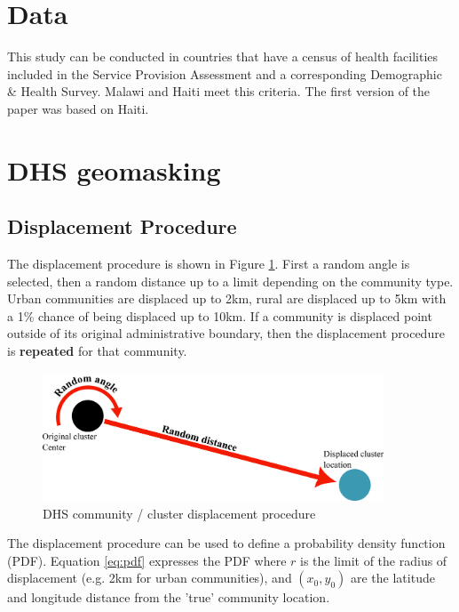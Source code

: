 \section{Data}

This study can be conducted in countries that have a census of health facilities included in the Service Provision Assessment and a corresponding Demographic \& Health Survey. Malawi and Haiti meet this criteria. The first version of the paper was based on Haiti.

\section{DHS geomasking}

\subsection{Displacement Procedure}
\label{subsubsec:dispProc}

The displacement procedure is shown in Figure \ref{fig:displaceProc}. First a random angle is selected, then a random distance up to a limit depending on the community type. Urban communities are displaced up to 2km, rural are displaced up to 5km with a 1\% chance of being displaced up to 10km. If a community is displaced point outside of its original administrative boundary, then the displacement procedure is \textbf{repeated} for that community.

    \begin{figure}[htbp]
        \centering
        \includegraphics[width=4in]{images/displacement.png}
        \caption{DHS community / cluster displacement procedure \cite{burgert_geographic_2013}}
        \label{fig:displaceProc}
    \end{figure}    

The displacement procedure can be used to define a probability density function (PDF). Equation \ref{eq:pdf} expresses the PDF where $r$ is the limit of the radius of displacement (e.g. 2km for urban communities), and $(x_{0},y_{0})$ are the latitude and longitude distance from the 'true' community location.

